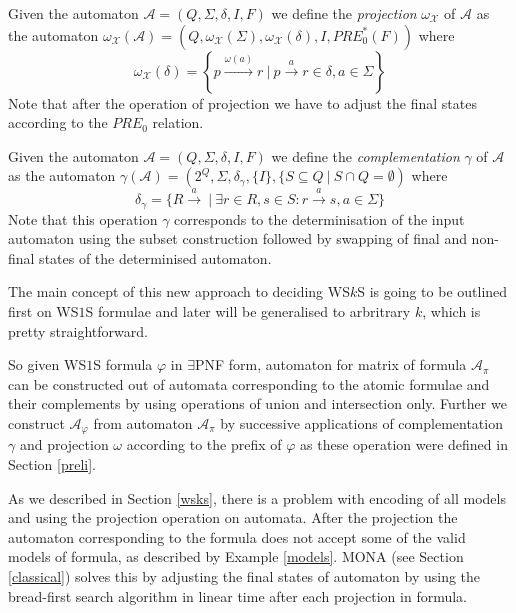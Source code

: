 \begin{defz}
 Given the automaton $\mathcal{A} = (Q, \Sigma, \delta, I, F)$ we define the
 \emph{projection} $\omega_\mathcal{X}$ of $\mathcal{A}$ as the automaton
 $\omega_\mathcal{X}(\mathcal{A}) = (Q, \omega_{\mathcal{X}}(\Sigma),
 \omega_{\mathcal{X}}(\delta), I, PRE_0^*(F))$ where
 \begin{equation}
  \omega_{\mathcal{X}}(\delta) = \left\{ p \overset{\omega(a)}{\longrightarrow}
  r\ |\ p \overset{a}{\rightarrow} r \in \delta, a \in \Sigma\right\}
 \end{equation}
 Note that after the operation of projection we have to adjust the final states
 according to the $PRE_0$ relation.
\end{defz}

\begin{defz}
 Given the automaton $\mathcal{A} = (Q, \Sigma, \delta, I, F)$ we define the
 \emph{complementation} $\gamma$ of $\mathcal{A}$ as the automaton
 $\gamma(\mathcal{A}) = (2^Q, \Sigma, \delta_\gamma, \{I\}, \{S \subseteq Q\
 |\ S \cap Q = \emptyset)$ where
 \begin{equation}
  \delta_\gamma = \{R \overset{a}{\rightarrow}\ |\ \exists r \in R, s \in S: r
  \overset{a}{\rightarrow} s, a \in \Sigma\}
 \end{equation}
 Note that this operation $\gamma$ corresponds to the determinisation of the
 input automaton using the subset construction followed by swapping of final and
 non-final states of the determinised automaton.
\end{defz}

The main concept of this new approach to deciding WS$k$S is going to be outlined
first on WS$1$S formulae and later will be generalised to arbritrary $k$, which
is pretty straightforward.

So given WS$1$S formula $\varphi$ in $\exists$PNF form, automaton for matrix of
formula $\mathcal{A}_\pi$ can be constructed out of automata corresponding to
the atomic formulae and their complements by using operations of union and
intersection only. Further we construct $\mathcal{A}_\varphi$ from automaton
$\mathcal{A}_\pi$ by successive applications of complementation $\gamma$ and
projection $\omega$ according to the prefix of $\varphi$ as these
operation were defined in Section \ref{preli}.

As we described in Section \ref{wsks}, there is a problem with encoding of all
models and using the projection operation on automata. After the projection the
automaton corresponding to the formula does not accept some of the valid models
of formula, as described by Example \ref{models}. \textsc{MONA} (see Section
\ref{classical}) solves this by adjusting the final states of automaton by using
the bread-first search algorithm in linear time after each projection in
formula.

